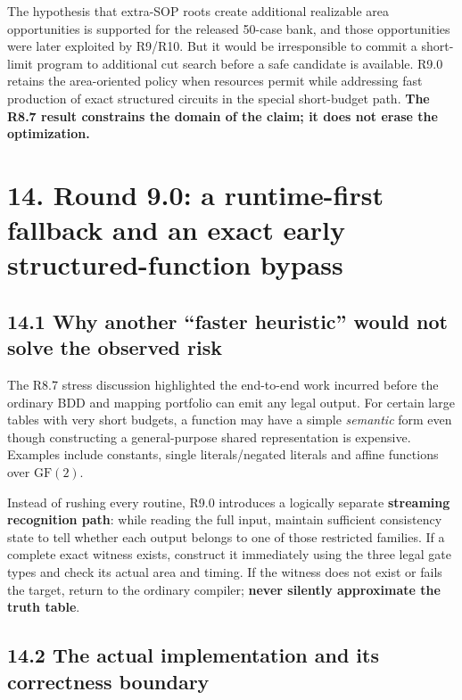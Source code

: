 The hypothesis that extra-SOP roots create additional realizable area opportunities is supported for the released 50-case bank, and those opportunities were later exploited by R9/R10. But it would be irresponsible to commit a short-limit program to additional cut search before a safe candidate is available. R9.0 retains the area-oriented policy when resources permit while addressing fast production of exact structured circuits in the special short-budget path. \textbf{The R8.7 result constrains the domain of the claim; it does not erase the optimization.}

\section{14. Round 9.0: a runtime-first fallback and an exact early structured-function bypass}\label{round-9.0-a-runtime-first-fallback-and-an-exact-early-structured-function-bypass}

\subsection{14.1 Why another ``faster heuristic'' would not solve the observed risk}\label{why-another-faster-heuristic-would-not-solve-the-observed-risk}

The R8.7 stress discussion highlighted the end-to-end work incurred before the ordinary BDD and mapping portfolio can emit any legal output. For certain large tables with very short budgets, a function may have a simple \emph{semantic} form even though constructing a general-purpose shared representation is expensive. Examples include constants, single literals/negated literals and affine functions over \(\mathrm{GF}(2)\).

Instead of rushing every routine, R9.0 introduces a logically separate \textbf{streaming recognition path}: while reading the full input, maintain sufficient consistency state to tell whether each output belongs to one of those restricted families. If a complete exact witness exists, construct it immediately using the three legal gate types and check its actual area and timing. If the witness does not exist or fails the target, return to the ordinary compiler; \textbf{never silently approximate the truth table}.

\subsection{14.2 The actual implementation and its correctness boundary}\label{the-actual-implementation-and-its-correctness-boundary}

